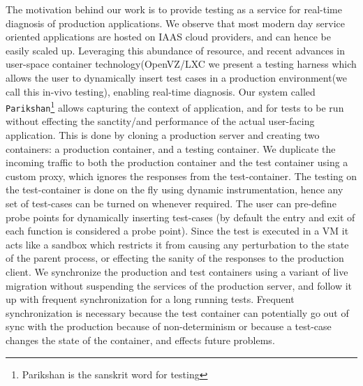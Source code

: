 The motivation behind our work is to provide testing as a service for real-time diagnosis of production applications.
We observe that most modern day service oriented applications are hosted on IAAS cloud providers, and can hence be easily scaled  up. 
Leveraging this abundance of resource, and recent advances in user-space container technology(OpenVZ/LXC\cite{openvz,linux} we present a testing harness which allows the user to dynamically insert test cases in a production environment(we call this in-vivo testing), enabling real-time diagnosis.
Our system called \texttt{Parikshan}\footnote{Parikshan is the sanskrit word for testing} allows capturing the context of application, and for tests to be run without effecting the sanctity/and performance of the actual user-facing application. 
This is done by cloning a production server and creating two containers: a production container, and a testing container. 
We duplicate the incoming traffic to both the production container and the test container using a custom proxy, which ignores the responses from the test-container. 
The testing on the test-container is done on the fly using dynamic instrumentation, hence any set of test-cases can be turned on whenever required. 
The user can pre-define probe points for dynamically inserting test-cases (by default the entry and exit of each function is considered a probe point).
Since the test is executed in a VM it acts like a sandbox which restricts it from causing any perturbation to the state of the parent process, or effecting the sanity of the responses to the production client. 
We synchronize the production and test containers using a variant of live migration without suspending the services of the production server, and follow it up with frequent synchronization for a long running tests. 
Frequent synchronization is necessary because the test container can potentially go out of sync with the production because of non-determinism or because a test-case changes the state of the container, and effects future problems. 

